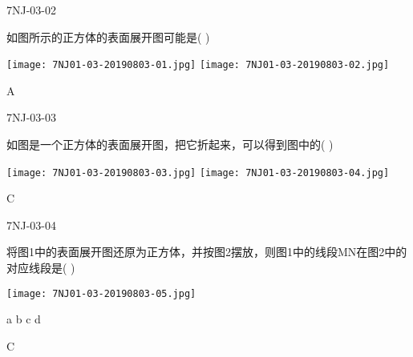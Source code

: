 \begin{defproblem}{7NJ-03-02}%
\begin{onlyproblem}%
如图所示的正方体的表面展开图可能是(    ) 
\begin{center}
\texttt{[image: 7NJ01-03-20190803-01.jpg]}
\texttt{[image: 7NJ01-03-20190803-02.jpg]}
\end{center}

\end{onlyproblem}%
\begin{onlysolution}%
\begin{solution}%
A
\end{solution}%
\end{onlysolution}%
\end{defproblem}




\begin{defproblem}{7NJ-03-03}%
\begin{onlyproblem}%
如图是一个正方体的表面展开图，把它折起来，可以得到图中的(    ) 
\begin{center}
\texttt{[image: 7NJ01-03-20190803-03.jpg]}
\texttt{[image: 7NJ01-03-20190803-04.jpg]}
\end{center}


\end{onlyproblem}%
\begin{onlysolution}%
\begin{solution}%
C
\end{solution}%
\end{onlysolution}%
\end{defproblem}




\begin{defproblem}{7NJ-03-04}%
\begin{onlyproblem}%
将图1中的表面展开图还原为正方体，并按图2摆放，则图1中的线段MN在图2中的对应线段是(    ) 
\begin{center}
\texttt{[image: 7NJ01-03-20190803-05.jpg]}
\end{center}

\xx
{a}
{b}
{c}
{d}

\end{onlyproblem}%
\begin{onlysolution}%
\begin{solution}%
C
\end{solution}%
\end{onlysolution}%
\end{defproblem}



